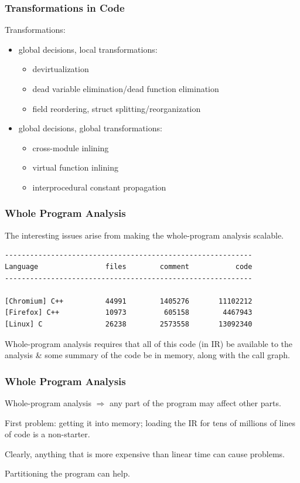 \begin{frame}
\frametitle{Transformations in Code}

Transformations:\\[-.5em]
\begin{itemize}
\item global decisions, local transformations:
\begin{itemize}
\item devirtualization
\item dead variable elimination/dead function elimination
\item field reordering, struct splitting/reorganization
\end{itemize}
\item global decisions, global transformations:
\begin{itemize}
\item cross-module inlining
\item virtual function inlining
\item interprocedural constant propagation
\end{itemize}
\end{itemize}


\end{frame}


\begin{frame}[fragile]
\frametitle{Whole Program Analysis}

The interesting issues arise from making the whole-program analysis scalable. 

\begin{verbatim}
-----------------------------------------------------------
Language                files        comment           code
-----------------------------------------------------------

[Chromium] C++          44991        1405276       11102212
[Firefox] C++           10973         605158        4467943
[Linux] C               26238        2573558       13092340
\end{verbatim}


Whole-program analysis requires that all of 
this code (in IR) be available to the analysis \& some summary of the code be in memory,  along with the call graph.

\end{frame}


\begin{frame}
\frametitle{Whole Program Analysis}

\large
\begin{changemargin}{2cm}

Whole-program analysis $\Rightarrow$ any part of the program may affect other parts. 

First problem: getting it into memory; loading the IR for tens of millions of lines of code is a non-starter.


Clearly, anything that is more expensive than linear time can cause problems. 

Partitioning the program can help.
\end{changemargin}

\end{frame}


